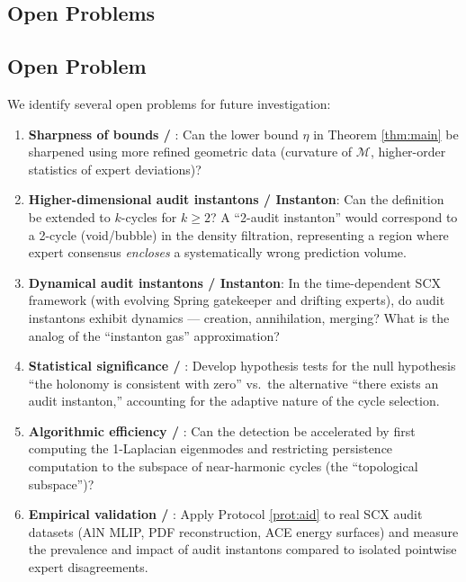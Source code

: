 \documentclass[11pt,a4paper]{article}
\theoremstyle{plain}
\theoremstyle{definition}
\newcommand{\cM}{\mathcal{M}}
\begin{document}
\subsection{Open Problems}
\subsection*{Open Problem}

We identify several open problems for future investigation:

\begin{enumerate}[label=\textbf{OP\arabic*}]
  \item \textbf{Sharpness of bounds / }: Can the lower bound 
        $\eta$ in Theorem \ref{thm:main} be sharpened using more refined 
        geometric data (curvature of $\cM$, higher-order statistics of 
        expert deviations)?
  
  \item \textbf{Higher-dimensional audit instantons / Instanton}: 
        Can the definition be extended to $k$-cycles for $k \geq 2$? A 
        ``2-audit instanton'' would correspond to a 2-cycle (void/bubble) 
        in the density filtration, representing a region where expert 
        consensus \emph{encloses} a systematically wrong prediction volume.
  
  \item \textbf{Dynamical audit instantons / Instanton}: In the 
        time-dependent SCX framework (with evolving Spring gatekeeper 
        and drifting experts), do audit instantons exhibit dynamics — 
        creation, annihilation, merging? What is the analog of the 
        ``instanton gas'' approximation?
  
  \item \textbf{Statistical significance / }: Develop 
        hypothesis tests for the null hypothesis ``the holonomy is 
        consistent with zero'' vs.\ the alternative ``there exists an 
        audit instanton,'' accounting for the adaptive nature of the 
        cycle selection.
  
  \item \textbf{Algorithmic efficiency / }: Can the detection 
        be accelerated by first computing the 1-Laplacian eigenmodes 
        and restricting persistence computation to the subspace of 
        near-harmonic cycles (the ``topological subspace'')?
  
  \item \textbf{Empirical validation / }: Apply Protocol 
        \ref{prot:aid} to real SCX audit datasets (AlN MLIP, PDF 
        reconstruction, ACE energy surfaces) and measure the prevalence 
        and impact of audit instantons compared to isolated pointwise 
        expert disagreements.
  

\end{enumerate}
\end{document}
